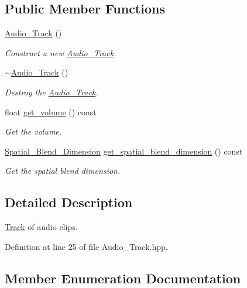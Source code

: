\subsection*{Public Member Functions}
\begin{DoxyCompactItemize}
\item 
\mbox{\hyperlink{classprz_1_1_audio___track_ad37bc5741cd0823f8f9277d00a81f50f}{Audio\+\_\+\+Track}} ()
\begin{DoxyCompactList}\small\item\em Construct a new \mbox{\hyperlink{classprz_1_1_audio___track}{Audio\+\_\+\+Track}}. \end{DoxyCompactList}\item 
\mbox{\hyperlink{classprz_1_1_audio___track_a32d24bf61b957d9d5e483eb4c4fbf5c2}{$\sim$\+Audio\+\_\+\+Track}} ()
\begin{DoxyCompactList}\small\item\em Destroy the \mbox{\hyperlink{classprz_1_1_audio___track}{Audio\+\_\+\+Track}}. \end{DoxyCompactList}\item 
float \mbox{\hyperlink{classprz_1_1_audio___track_ad3a1f86e10f7e128a5589b621ff28b45}{get\+\_\+volume}} () const
\begin{DoxyCompactList}\small\item\em Get the volume. \end{DoxyCompactList}\item 
\mbox{\hyperlink{classprz_1_1_audio___track_a4fb1dc3dd45713ba4c3e56918721d12a}{Spatial\+\_\+\+Blend\+\_\+\+Dimension}} \mbox{\hyperlink{classprz_1_1_audio___track_ac10fc428fddc350fb7e6b4d29d287a3a}{get\+\_\+spatial\+\_\+blend\+\_\+dimension}} () const
\begin{DoxyCompactList}\small\item\em Get the spatial blend dimension. \end{DoxyCompactList}\end{DoxyCompactItemize}


\subsection{Detailed Description}
\mbox{\hyperlink{classprz_1_1_track}{Track}} of audio clips. 



Definition at line 25 of file Audio\+\_\+\+Track.\+hpp.



\subsection{Member Enumeration Documentation}
\mbox{\label{classprz_1_1_audio___track_a4fb1dc3dd45713ba4c3e56918721d12a}} 
